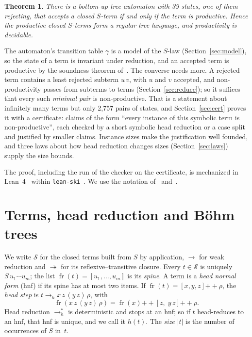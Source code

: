 \documentclass[11pt]{amsart}
\newtheorem{theorem}{Theorem}
\theoremstyle{definition}
\theoremstyle{remark}
\newcommand{\spine}{\operatorname{fr}}
\newcommand{\app}{\mathbin{+\!\!+}}
\newcommand{\hred}{\to_{h}^{*}}
\newcommand{\sz}[1]{|#1|}
\begin{document}
\begin{theorem}\label{thm:main}
There is a bottom-up tree automaton with 39 states, one of them rejecting, that accepts a
closed $S$-term if and only if the term is productive. Hence the productive closed
$S$-terms form a regular tree language, and productivity is decidable.
\end{theorem}

The automaton's transition table $\gamma$ is a model of the $S$-law (Section~\ref{sec:model}),
so the state of a term is invariant under reduction, and an accepted term is
productive by the soundness theorem of~\citep{s1}. The converse needs more. A rejected term
contains a least rejected subterm $u\,v$, with $u$ and $v$ accepted, and non-productivity
passes from subterms to terms (Section~\ref{sec:reduce}); so it suffices that every such
\emph{minimal pair} is non-productive. That is a statement about infinitely many terms
but only 2,757 pairs of states, and Section~\ref{sec:cert} proves it with a certificate:
claims of the form ``every instance of this symbolic term is non-productive'', each
checked by a short symbolic head reduction or a case split and justified by smaller claims. Instance sizes
make the justification well founded, and three laws about how head reduction changes
sizes (Section~\ref{sec:laws}) supply the size bounds.

The proof, including the run of the checker on the certificate, is mechanized in
Lean~4~\citep{lean4} within \texttt{lean-ski}~\citep{leanski}. We use the notation of~\citep{s1} and~\citep{barendregt}.

\section{Terms, head reduction and B\"ohm trees}\label{sec:prelims}

We write $\mathcal S$ for the closed terms built from $S$ by application, $\to$ for weak
reduction and $\twoheadrightarrow$ for its reflexive--transitive closure. Every
$t\in\mathcal S$ is uniquely $S\,u_1\cdots u_m$; the list $\spine(t)=[u_1,\dots,u_m]$ is
its \emph{spine}. A term is a \emph{head normal form} (hnf) if its spine has at most two
items. If $\spine(t)=[x,y,z]\app\rho$, the \emph{head step} is
$t\to_h x\,z\,(y\,z)\,\rho$, with
\begin{equation}\label{eq:headstep}
\spine(x\,z\,(y\,z)\,\rho)=\spine(x)\app[z,\;y\,z]\app\rho .
\end{equation}
Head reduction $\hred$ is deterministic and stops at an hnf; so if $t$
head-reduces to an hnf, that hnf is unique, and we call it $h(t)$. The \emph{size}
$\sz t$ is the number of occurrences of $S$ in~$t$.
\end{document}
